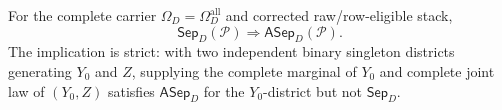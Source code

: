 For the complete carrier \(\Omega_D=\Omega_D^{\mathrm{all}}\) and corrected raw/row-eligible stack,
\[
\mathsf{Sep}_D(\mathcal P)\Longrightarrow\mathsf{ASep}_D(\mathcal P).
\]
The implication is strict: with two independent binary singleton districts generating \(Y_0\) and \(Z\), supplying the complete marginal of \(Y_0\) and complete joint law of \((Y_0,Z)\) satisfies \(\mathsf{ASep}_D\) for the \(Y_0\)-district but not \(\mathsf{Sep}_D\).